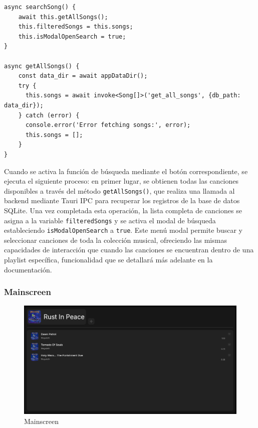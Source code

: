 \documentclass[11pt, a4paper]{article}
\begin{document}
                \begin{lstlisting}[caption={searchSong()}]
async searchSong() {
    await this.getAllSongs();
    this.filteredSongs = this.songs;
    this.isModalOpenSearch = true;
}

async getAllSongs() {
    const data_dir = await appDataDir();
    try {
      this.songs = await invoke<Song[]>('get_all_songs', {db_path: data_dir});
    } catch (error) {
      console.error('Error fetching songs:', error);
      this.songs = [];
    }
}
                \end{lstlisting}

                Cuando se activa la función de búsqueda mediante el botón correspondiente, se ejecuta el siguiente proceso: en primer lugar, se obtienen todas las canciones disponibles a través del método \texttt{getAllSongs()}, que realiza una llamada al backend mediante Tauri IPC para recuperar los registros de la base de datos SQLite. Una vez completada esta operación, la lista completa de canciones se asigna a la variable \texttt{filteredSongs} y se activa el modal de búsqueda estableciendo \texttt{isModalOpenSearch} a \texttt{true}. Este menú modal permite buscar y seleccionar canciones de toda la colección musical, ofreciendo las mismas capacidades de interacción que cuando las canciones se encuentran dentro de una playlist específica, funcionalidad que se detallará más adelante en la documentación.


            \subsubsection{Mainscreen}

            \begin{figure}[H]
                \centering
                \includegraphics[width=1\textwidth]{media/screenshots/playlist.png}
                \caption{Mainscreen}
                \label{fig:Mainscreen}
            \end{figure}
\end{document}
